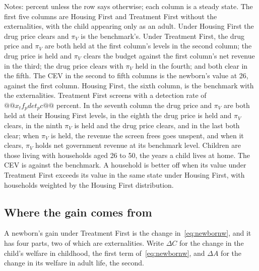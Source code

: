 \documentclass[10pt]{article}
\newcommand{\notes}[2]{\par\vspace{0.4em}%
  \begin{minipage}{#1}\footnotesize #2\end{minipage}}
\newcommand{\tabnote}[1]{\notes{\wd\ntbox}{#1}}
\begin{document}
\begin{table}[!tb]\centering
\caption{The long run under each policy}\label{tab:longrun}
\begingroup\scriptsize\setlength{\tabcolsep}{3pt}
\sbox{\ntbox}{}\usebox{\ntbox}
\tabnote{Notes: percent unless the row says otherwise; each column is a steady state. The first five columns are Housing First and Treatment First without the externalities, with the child appearing only as an adult. Under Housing First the drug price clears and $\pi_V$ is the benchmark's. Under Treatment First, the drug price and $\pi_V$ are both held at the first column's levels in the second column; the drug price is held and $\pi_V$ clears the budget against the first column's net revenue in the third; the drug price clears with $\pi_V$ held in the fourth; and both clear in the fifth. The CEV in the second to fifth columns is the newborn's value at 26, against the first column.
Housing First, the sixth column, is the benchmark with the externalities. Treatment First screens with a detection rate of
$@@x_tf_pdet_pc@@$ percent. In the seventh column the drug price and $\pi_V$ are both held at their Housing First levels, in the eighth the drug price is held and $\pi_V$ clears, in the ninth $\pi_V$ is held and the drug price clears, and in the last both clear; when $\pi_V$ is held, the revenue the screen frees goes unspent, and when it clears, $\pi_V$ holds net government revenue at its benchmark level. Children are those living with households aged 26 to 50, the years a child lives at
home. The CEV is against the benchmark. A household is better off when its value under Treatment First exceeds
its value in the same state under Housing First, with households weighted by the Housing First distribution.}
\endgroup
\end{table}

\subsection{Where the gain comes from}\label{sec:parts}

A newborn's gain under Treatment First is the change in~\eqref{eq:newbornw}, and it has four parts, two of which are externalities. Write $\Delta C$ for the change in the child's welfare in childhood, the first term of~\eqref{eq:newbornw}, and $\Delta A$ for the change in its welfare in adult life, the second.
\end{document}
